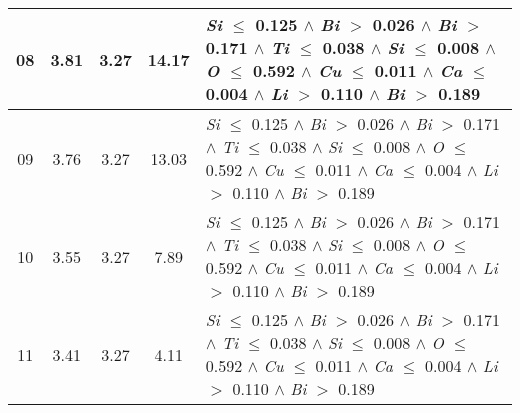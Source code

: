 \begin{table}[!htbp]
\begin{tabular}{ccccm{}}
		\hline
		08 & 3.81 & 3.27 & 14.17 & \textit{Si} $\le$ 0.125 $\wedge$ \textit{Bi} $>$ 0.026 $\wedge$ \textit{Bi} $>$ 0.171 $\wedge$ \textit{Ti} $\le$ 0.038 $\wedge$ \textit{Si} $\le$ 0.008 $\wedge$ \textit{O} $\le$ 0.592 $\wedge$ \textit{Cu} $\le$ 0.011 $\wedge$ \textit{Ca} $\le$ 0.004 $\wedge$ \textit{Li} $>$ 0.110 $\wedge$ \textit{Bi} $>$ 0.189\\
		\hline
		09 & 3.76 & 3.27 & 13.03 & \textit{Si} $\le$ 0.125 $\wedge$ \textit{Bi} $>$ 0.026 $\wedge$ \textit{Bi} $>$ 0.171 $\wedge$ \textit{Ti} $\le$ 0.038 $\wedge$ \textit{Si} $\le$ 0.008 $\wedge$ \textit{O} $\le$ 0.592 $\wedge$ \textit{Cu} $\le$ 0.011 $\wedge$ \textit{Ca} $\le$ 0.004 $\wedge$ \textit{Li} $>$ 0.110 $\wedge$ \textit{Bi} $>$ 0.189\\
		\hline
		10 & 3.55 & 3.27 & 7.89 & \textit{Si} $\le$ 0.125 $\wedge$ \textit{Bi} $>$ 0.026 $\wedge$ \textit{Bi} $>$ 0.171 $\wedge$ \textit{Ti} $\le$ 0.038 $\wedge$ \textit{Si} $\le$ 0.008 $\wedge$ \textit{O} $\le$ 0.592 $\wedge$ \textit{Cu} $\le$ 0.011 $\wedge$ \textit{Ca} $\le$ 0.004 $\wedge$ \textit{Li} $>$ 0.110 $\wedge$ \textit{Bi} $>$ 0.189\\
		\hline
		11 & 3.41 & 3.27 & 4.11 & \textit{Si} $\le$ 0.125 $\wedge$ \textit{Bi} $>$ 0.026 $\wedge$ \textit{Bi} $>$ 0.171 $\wedge$ \textit{Ti} $\le$ 0.038 $\wedge$ \textit{Si} $\le$ 0.008 $\wedge$ \textit{O} $\le$ 0.592 $\wedge$ \textit{Cu} $\le$ 0.011 $\wedge$ \textit{Ca} $\le$ 0.004 $\wedge$ \textit{Li} $>$ 0.110 $\wedge$ \textit{Bi} $>$ 0.189\\
		\bottomrule
	\end{tabular}
\end{table}
